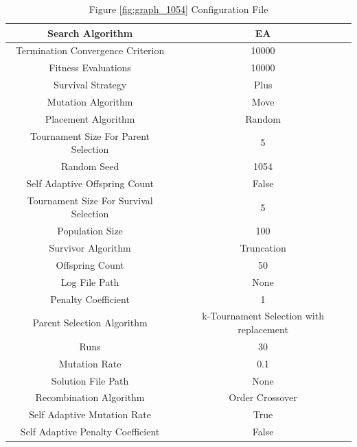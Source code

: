 \documentclass{standalone}
\begin{document}
\begin{table}[!htb]
	\centering
	\caption{Figure \ref{fig:graph_1054} Configuration File}
	\label{tab:graph_1054}
	\begin{tabular}{| c | c |}
		\hline
		Search Algorithm		& EA		 \\
		\hline
		Termination Convergence Criterion		& 10000		 \\
		\hline
		Fitness Evaluations		& 10000		 \\
		\hline
		Survival Strategy		& Plus		 \\
		\hline
		Mutation Algorithm		& Move		 \\
		\hline
		Placement Algorithm		& Random		 \\
		\hline
		Tournament Size For Parent Selection		& 5		 \\
		\hline
		Random Seed		& 1054		 \\
		\hline
		Self Adaptive Offspring Count		& False		 \\
		\hline
		Tournament Size For Survival Selection		& 5		 \\
		\hline
		Population Size		& 100		 \\
		\hline
		Survivor Algorithm		& Truncation		 \\
		\hline
		Offspring Count		& 50		 \\
		\hline
		Log File Path		& None		 \\
		\hline
		Penalty Coefficient		& 1		 \\
		\hline
		Parent Selection Algorithm		& k-Tournament Selection with replacement		 \\
		\hline
		Runs		& 30		 \\
		\hline
		Mutation Rate		& 0.1		 \\
		\hline
		Solution File Path		& None		 \\
		\hline
		Recombination Algorithm		& Order Crossover		 \\
		\hline
		Self Adaptive Mutation Rate		& True		 \\
		\hline
		Self Adaptive Penalty Coefficient		& False		 \\
		\hline
	\end{tabular}
\end{table}
\end{document}
